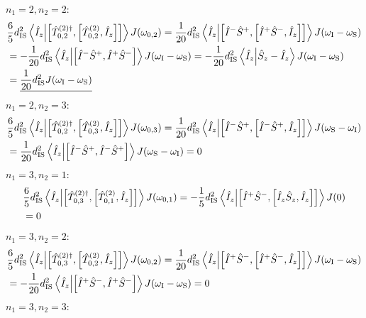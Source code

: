 \begin{appendixtext}
$n_1 = 2, n_2 = 2$:
\begin{align*}
&\frac{6}{5} d_{\text{IS}}^2 \bra{\hat{I}_z} \ket{\comm{\hat{T}_{0, 2}^{(2) \dagger}}{\comm{\hat{T}_{0,2}^{(2)}}{\hat{I}_z}}} J(\omega_{0,2}) = \frac{1}{20} d_{\text{IS}}^2 \bra{\hat{I}_z} \ket{\comm{\hat{I}^- \hat{S}^+}{\comm{\hat{I}^+ \hat{S}^-}{\hat{I}_z}}} J(\omega_{\text{I}} - \omega_{\text{S}}) \\
&= -\frac{1}{20} d_{\text{IS}}^2 \bra{\hat{I}_z} \ket{\comm{\hat{I}^- \hat{S}^+}{\hat{I}^+ \hat{S}^-}} J(\omega_{\text{I}} - \omega_{\text{S}}) = -\frac{1}{20} d_{\text{IS}}^2 \bra{\hat{I}_z} \ket{\hat{S}_z - \hat{I}_z} J(\omega_{\text{I}} - \omega_{\text{S}}) \\
& = \underline{\frac{1}{20} d_{\text{IS}}^2 J(\omega_{\text{I}} - \omega_{\text{S}})}
\end{align*}
$n_1 = 2, n_2 = 3$:
\begin{align*}
&\frac{6}{5} d_{\text{IS}}^2 \bra{\hat{I}_z} \ket{\comm{\hat{T}_{0,2}^{(2) \dagger}}{\comm{\hat{T}_{0,3}^{(2)}}{\hat{I}_z}}} J(\omega_{0,3}) = \frac{1}{20} d_{\text{IS}}^2 \bra{\hat{I}_z} \ket{\comm{\hat{I}^- \hat{S}^+}{\comm{\hat{I}^- \hat{S}^+}{\hat{I}_z}}} J(\omega_{\text{S}} - \omega_{\text{I}}) \\
&= \frac{1}{20} d_{\text{IS}}^2 \bra{\hat{I}_z} \ket{\comm{\hat{I}^- \hat{S}^+}{\hat{I}^- \hat{S}^+}} J(\omega_{\text{S}} - \omega_{\text{I}}) = 0
\end{align*}
$n_1 = 3, n_2 = 1$:
\begin{align*}
&\frac{6}{5} d_{\text{IS}}^2 \bra{\hat{I}_z} \ket{\comm{\hat{T}_{0,3}^{(2) \dagger}}{\comm{\hat{T}_{0,1}^{(2)}}{\hat{I}_z}}} J(\omega_{0,1}) = -\frac{1}{5} d_{\text{IS}}^2 \bra{\hat{I}_z} \ket{\comm{\hat{I}^+ \hat{S}^-}{\comm{\hat{I}_z \hat{S}_z}{\hat{I}_z}}} J(0) \\
&= 0
\end{align*}
$n_1 = 3, n_2 = 2$:
\begin{align*}
&\frac{6}{5} d_{\text{IS}}^2 \bra{\hat{I}_z} \ket{\comm{\hat{T}_{0,3}^{(2) \dagger}}{\comm{\hat{T}_{0,2}^{(2)}}{\hat{I}_z}}} J(\omega_{0,2}) = \frac{1}{20} d_{\text{IS}}^2 \bra{\hat{I}_z} \ket{\comm{\hat{I}^+ \hat{S}^-}{\comm{\hat{I}^+ \hat{S}^-}{\hat{I}_z}}} J(\omega_{\text{I}} - \omega_{\text{S}}) \\
&= -\frac{1}{20} d_{\text{IS}}^2 \bra{\hat{I}_z} \ket{\comm{\hat{I}^+ \hat{S}^-}{\hat{I}^+ \hat{S}^-}} J(\omega_{\text{I}} - \omega_{\text{S}}) = 0
\end{align*}
$n_1 = 3, n_2 = 3$:
\begin{align*}

\end{align*}
\end{appendixtext}

